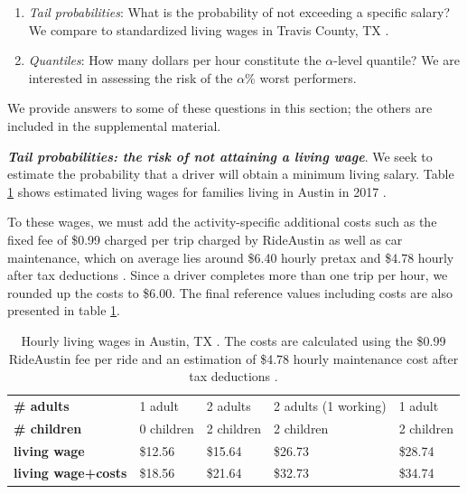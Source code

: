 \documentclass[a4paper, 11pt]{article}
\begin{document}
 \begin{enumerate}
     \item \textit{Tail probabilities}: What is the probability of not exceeding a specific salary? We compare to standardized living wages in Travis County, TX \citep{nadeau-2017}. 
     \item \textit{Quantiles}: How many dollars per hour constitute the $\alpha$-level quantile? We are interested in assessing the risk of the $\alpha$\% worst performers.
 \end{enumerate}
 
 We provide answers to some of these questions in this section; the others are included in the supplemental material. 

{\bfseries \itshape Tail probabilities: the risk of not attaining a living wage}. We seek to estimate the probability that a driver will obtain a minimum living salary. Table \ref{tbl:livingwages} shows estimated living wages for families living in Austin in 2017 \citep{nadeau-2017}. 

To these wages, we must add the activity-specific additional costs such as the fixed fee of \$0.99 charged per trip charged by RideAustin as well as car maintenance, which on average lies around \$6.40 hourly pretax and \$4.78 hourly after tax deductions \citep{mishel-2018} \citep{hall-etal-2016}. Since a driver completes more than one trip per hour, we rounded up the costs to \$6.00. The final reference values including costs are also presented in table \ref{tbl:livingwages}.

\begin{table}[tb]
    \centering
    \small
    \begin{tabular}{l|l|l|l|l}
        \textbf{\# adults} & 1 adult &  2 adults & 2 adults (1 working) & 1 adult  \\ %
        \textbf{\# children} & 0 children  &   2 children & 2 children & 2 children  \\
       \hline
        \textbf{living wage} & \$12.56  & \$15.64 & \$26.73 & \$28.74  \\ 
        \textbf{living wage+costs} & \$18.56  & \$21.64 & \$32.73 & \$34.74  \\ 
    \end{tabular}
    \caption{Hourly living wages in Austin, TX \citep{nadeau-2017}. The costs are calculated using the \$0.99 RideAustin fee per ride and an estimation of \$4.78 hourly maintenance cost after tax deductions \citep{mishel-2018}.}
    \label{tbl:livingwages}
\end{table}
\end{document}
